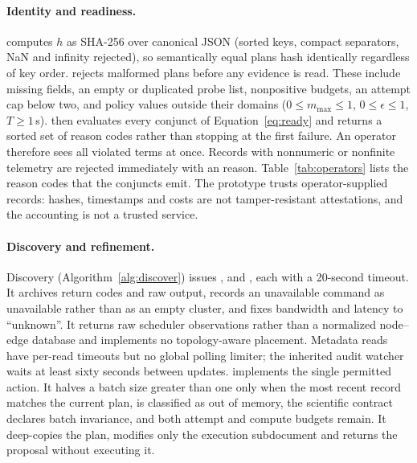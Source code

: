 \paragraph{Identity and readiness.}  computes $h$ as SHA-256 over canonical JSON (sorted keys, compact separators, NaN and infinity rejected), so semantically equal plans hash identically regardless of key order.  rejects malformed plans before any evidence is read. These include missing fields, an empty or duplicated probe list, nonpositive budgets, an attempt cap below two, and policy values outside their domains ($0\leq m_{\max}\leq 1$, $0\leq\epsilon\leq 1$, $T\geq 1$\,s).  then evaluates every conjunct of Equation~\eqref{eq:ready} and returns a sorted set of reason codes rather than stopping at the first failure. An operator therefore sees all violated terms at once. Records with nonnumeric or nonfinite telemetry are rejected immediately with an  reason. Table~\ref{tab:operators} lists the reason codes that the conjuncts emit. The prototype trusts operator-supplied records: hashes, timestamps and costs are not tamper-resistant attestations, and the accounting is not a trusted service.

\paragraph{Discovery and refinement.} Discovery (Algorithm~\ref{alg:discover}) issues ,  and , each with a 20-second timeout. It archives return codes and raw output, records an unavailable command as unavailable rather than as an empty cluster, and fixes bandwidth and latency to ``unknown''. It returns raw scheduler observations rather than a normalized node--edge database and implements no topology-aware placement. Metadata reads have per-read timeouts but no global polling limiter; the inherited audit watcher waits at least sixty seconds between updates.  implements the single permitted action. It halves a batch size greater than one only when the most recent record matches the current plan, is classified as out of memory, the scientific contract declares batch invariance, and both attempt and compute budgets remain. It deep-copies the plan, modifies only the execution subdocument and returns the proposal without executing it.

